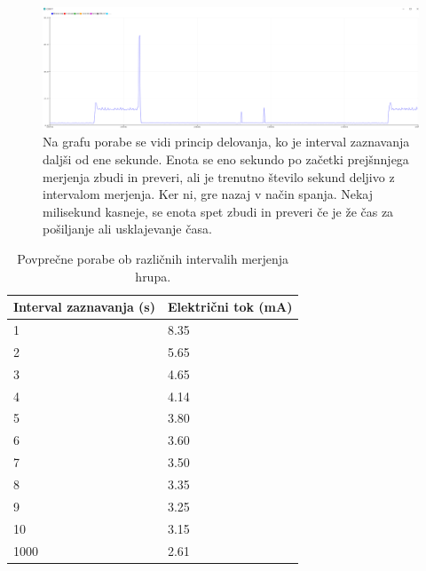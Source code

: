 \documentclass[a4paper, 12pt]{book}
\begin{document}
\begin{figure}[H]
    \centering
    \includegraphics[width=\linewidth]{slikovno_gradivo/poraba-graf4.png}
    \caption{Na grafu porabe se vidi princip delovanja, ko je interval zaznavanja daljši od ene sekunde. Enota se eno sekundo po začetki prejšnnjega merjenja zbudi in preveri, ali je trenutno število sekund deljivo z intervalom merjenja. Ker ni, gre nazaj v način spanja. Nekaj milisekund kasneje, se enota spet zbudi in preveri če je že čas za pošiljanje ali usklajevanje časa.}
    \label{fig:poraba4}
\end{figure}



\begin{table}[H]
\begin{tabular}{l|l}
\multicolumn{1}{l}{Interval zaznavanja (s)} \vline & \multicolumn{1}{l}{Električni tok (mA)} \\ \hline
1                                             & 8.35                                     \\
2                                             & 5.65                                     \\
3                                             & 4.65                                     \\
4                                             & 4.14                                     \\
5                                             & 3.80                                     \\
6                                             & 3.60                                     \\
7                                             & 3.50                                     \\
8                                             & 3.35                                     \\
9                                             & 3.25                                     \\
10                                            & 3.15                                     \\
1000                                          & 2.61                                    
\end{tabular}
\caption{Povprečne porabe ob različnih intervalih merjenja hrupa.}
\label{tbl:poraba_tabela}

\end{table}
\end{document}
